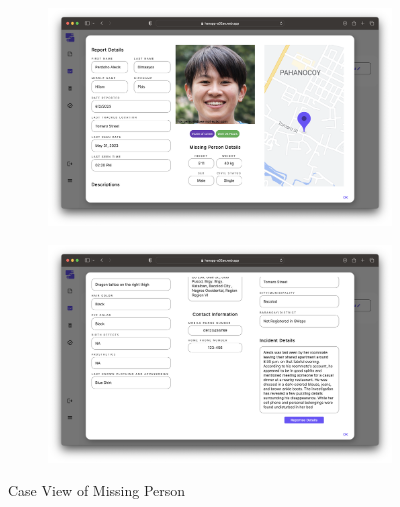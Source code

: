 \begin{figure}[!h]
    \centering
    \begin{subfigure}[c]{1\linewidth}
        \centering
        \includegraphics[scale=0.25]{figures/Chapter4/PNP/CaseView-1.png}
    \end{subfigure}
    \centering
    \begin{subfigure}[c]{1\linewidth}
        \centering
        \includegraphics[scale=0.25]{figures/Chapter4/PNP/CaseView-2.png}
    \end{subfigure}
    \caption{Case View of Missing Person}
    \label{fig:caseViewDetails}
\end{figure}

